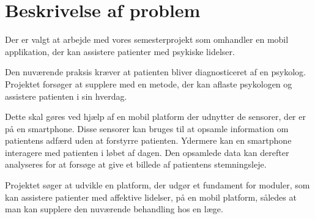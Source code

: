 \section{Beskrivelse af problem}
Der er valgt at arbejde med vores semesterprojekt som omhandler en mobil applikation, der kan assistere patienter med psykiske lidelser.

Den nuværende praksis kræver at patienten bliver diagnosticeret af en psykolog.
Projektet forsøger at supplere med en metode, der kan aflaste psykologen og assistere patienten i sin hverdag.

Dette skal gøres ved hjælp af en mobil platform der udnytter de sensorer, der er på en smartphone.
Disse sensorer kan bruges til at opsamle information om patientens adfærd uden at forstyrre patienten.
Ydermere kan en smartphone interagere med patienten i løbet af dagen. 
Den opsamlede data kan derefter analyseres for at forsøge at give et billede af patientens stemningsleje.

Projektet søger at udvikle en platform, der udgør et fundament for moduler, som kan assistere patienter med affektive lidelser, på en mobil platform, således at man kan supplere den nuværende behandling hos en læge.